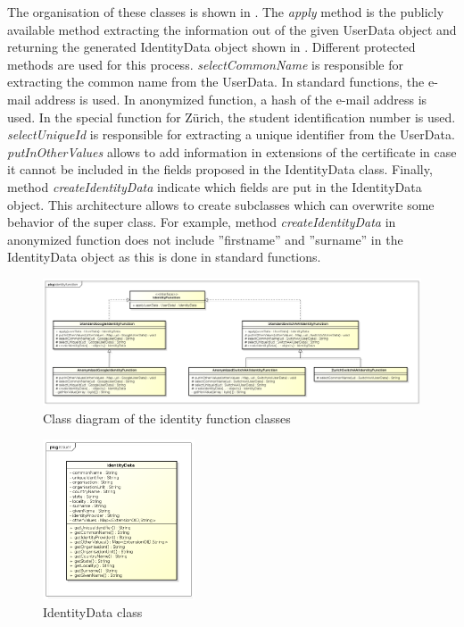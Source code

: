 \documentclass[oneside]{scrreprt}
\begin{document}
The organisation of these classes is shown in . The \textit{apply} method is the publicly available method extracting the information out of the given UserData object and returning the generated IdentityData object shown in . Different protected methods are used for this process. \textit{selectCommonName} is responsible for extracting the common name from the UserData. In standard functions, the e-mail address is used. In anonymized function, a hash of the e-mail address is used. In the special function for Zürich, the student identification number is used. \textit{selectUniqueId} is responsible for extracting a unique identifier from the UserData. \textit{putInOtherValues} allows to add information in extensions of the certificate in case it cannot be included in the fields proposed in the IdentityData class. Finally, method \textit{createIdentityData} indicate which fields are put in the IdentityData object. This architecture allows to create subclasses which can overwrite some behavior of the super class. For example, method \textit{createIdentityData} in anonymized function does not include ''firstname'' and ''surname'' in the IdentityData object as this is done in standard functions.

\begin{figure}[ht]
\centerline{
\includegraphics[width=\textwidth]{figs/identity_function_class_diagram.png}}
\caption{Class diagram of the identity function classes}
\label{fig:identity_function_class_diagram}
\end{figure}

\begin{figure}[ht]
\centerline{
\includegraphics[width=0.4\textwidth]{figs/IdentityData_class.png}}
\caption{IdentityData class}
\label{fig:identity_data}
\end{figure}
\end{document}
